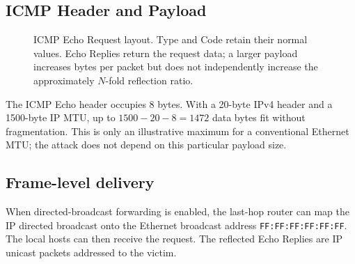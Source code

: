 \documentclass[12pt,a4paper]{article}
\begin{document}
\subsection{ICMP Header and Payload}
\begin{figure}[H]
\centering

\caption{ICMP Echo Request layout. Type and Code retain their normal values. Echo Replies return the request data; a larger payload increases bytes per packet but does not independently increase the approximately $N$-fold reflection ratio.}
\end{figure}

The ICMP Echo header occupies 8 bytes. With a 20-byte IPv4 header and a 1500-byte IP MTU, up to $1500-20-8=1472$ data bytes fit without fragmentation. This is only an illustrative maximum for a conventional Ethernet MTU; the attack does not depend on this particular payload size.

\subsection{Frame-level delivery}
When directed-broadcast forwarding is enabled, the last-hop router can map the IP directed broadcast onto the Ethernet broadcast address \texttt{FF:FF:FF:FF:FF:FF}. The local hosts can then receive the request. The reflected Echo Replies are IP unicast packets addressed to the victim.
\end{document}
